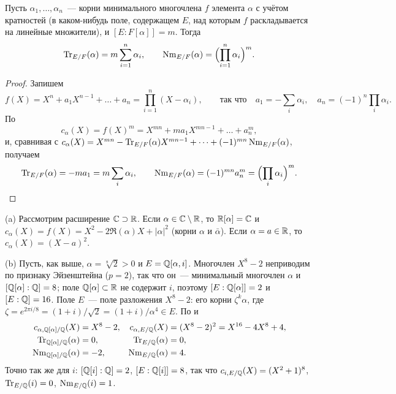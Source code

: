\begin{corollary}[5.45]
Пусть $\alpha_1,\dots,\alpha_n$~--- корни минимального многочлена $f$ элемента $\alpha$ с учётом кратностей (в
каком-нибудь поле, содержащем $E$, над которым $f$ раскладывается на линейные множители), и $[E:F[\alpha]]=m$. Тогда
\[
\operatorname{Tr}_{E/F}(\alpha)=m\sum_{i=1}^n\alpha_i,\qquad \operatorname{Nm}_{E/F}(\alpha)=\Bigl(\prod_{i=1}^n\alpha_i\Bigr)^m .
\]
\end{corollary}

\begin{proof}
Запишем
\[
f(X)=X^n+a_1X^{n-1}+\dots+a_n=\prod_{i=1}^n(X-\alpha_i),\qquad\text{так что}\quad
a_1=-\sum_i\alpha_i,\quad a_n=(-1)^n\prod_i\alpha_i .
\]
По 
\[
c_\alpha(X)=f(X)^m=X^{mn}+ma_1X^{mn-1}+\dots+a_n^m,
\]
и, сравнивая с $c_\alpha(X)=X^{mn}-\operatorname{Tr}_{E/F}(\alpha)X^{mn-1}+\dots+(-1)^{mn}\operatorname{Nm}_{E/F}(\alpha)$, получаем
\[
\operatorname{Tr}_{E/F}(\alpha)=-ma_1=m\sum_i\alpha_i,\qquad \operatorname{Nm}_{E/F}(\alpha)=(-1)^{mn}a_n^m=\Bigl(\prod_i\alpha_i\Bigr)^m. \qedhere
\]
\end{proof}

\begin{example}[5.46]
(a) Рассмотрим расширение $\mathbb C\supset\mathbb R$. Если $\alpha\in\mathbb C\setminus\mathbb R$, то $\mathbb R[\alpha]=\mathbb C$ и
$c_\alpha(X)=f(X)=X^2-2\Re(\alpha)X+|\alpha|^2$ (корни $\alpha$ и $\bar\alpha$). Если $\alpha=a\in\mathbb R$, то
$c_\alpha(X)=(X-a)^2$.

(b) Пусть, как выше, $\alpha=\sqrt[8]2>0$ и $E=\mathbb Q[\alpha,i]$. Многочлен $X^8-2$ неприводим по признаку Эйзенштейна
($p=2$), так что он~--- минимальный многочлен $\alpha$ и $[\mathbb Q[\alpha]:\mathbb Q]=8$; поле $\mathbb Q[\alpha]\subset\mathbb R$ не содержит $i$,
поэтому $[E:\mathbb Q[\alpha]]=2$ и $[E:\mathbb Q]=16$. Поле $E$~--- поле разложения $X^8-2$: его корни $\zeta^k\alpha$, где
$\zeta=e^{2\pi i/8}=(1+i)/\sqrt2=(1+i)/\alpha^4\in E$. По  и 
\begin{align*}
c_{\alpha,\mathbb Q[\alpha]/\mathbb Q}(X)&=X^8-2, & c_{\alpha,E/\mathbb Q}(X)&=(X^8-2)^2=X^{16}-4X^8+4,\\
\operatorname{Tr}_{\mathbb Q[\alpha]/\mathbb Q}(\alpha)&=0, & \operatorname{Tr}_{E/\mathbb Q}(\alpha)&=0,\\
\operatorname{Nm}_{\mathbb Q[\alpha]/\mathbb Q}(\alpha)&=-2, & \operatorname{Nm}_{E/\mathbb Q}(\alpha)&=4 .
\end{align*}
Точно так же для $i$: $[\mathbb Q[i]:\mathbb Q]=2$, $[E:\mathbb Q[i]]=8$, так что $c_{i,E/\mathbb Q}(X)=(X^2+1)^8$, $\operatorname{Tr}_{E/\mathbb Q}(i)=0$,
$\operatorname{Nm}_{E/\mathbb Q}(i)=1$.
\end{example}

